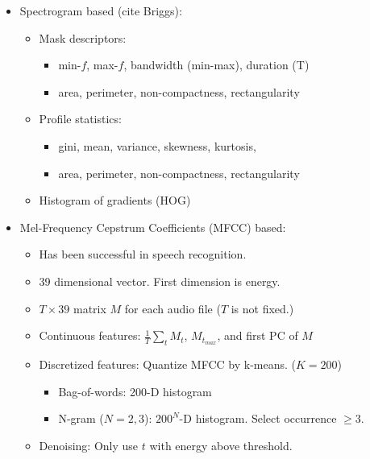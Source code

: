 \begin{itemize}
	\item Spectrogram based (cite Briggs):
	\begin{itemize}
		\item Mask descriptors: 
		\begin{itemize}
			\item min-$f$, max-$f$, bandwidth (min-max), duration (T)
			\item area, perimeter, non-compactness, rectangularity		
		\end{itemize}
		\item Profile statistics:
		\begin{itemize}
			\item gini, mean, variance, skewness, kurtosis, 
			\item area, perimeter, non-compactness, rectangularity		
		\end{itemize}
		\item Histogram of gradients (HOG)
	\end{itemize}
	\item Mel-Frequency Cepstrum Coefficients (MFCC) based: 
	\begin{itemize}
		\item Has been successful in speech recognition.
		\item 39 dimensional vector. First dimension is energy.
		\item $ T \times 39$ matrix $M$ for each audio file ($T$ is not fixed.)
		\item Continuous features: $\frac{1}{T}\sum_t M_t$, $M_{t_{max}}$, and first PC of $M$
		\item Discretized features: Quantize MFCC by k-means. ($K=200$)
		\begin{itemize}
			\item Bag-of-words: 200-D histogram
			\item N-gram ($N=2,3$): $200^N$-D histogram. Select occurrence $\geq 3$. 
		\end{itemize}
		\item Denoising: Only use $t$ with energy above threshold.	
	\end{itemize}
\end{itemize}